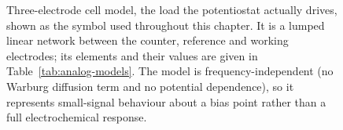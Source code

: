 \providecommand{\MaestroRoot}{include/analog/}

\begin{figure}[htbp]
  \centering
\begin{circuitikz}[
    every node/.append style={font=\footnotesize},
    nlab/.style={font=\scriptsize, inner sep=1.5pt},
  ]
\end{circuitikz}
  \caption[{Three-electrode cell model.}]{Three-electrode cell model, the load the potentiostat actually drives, shown as the symbol used throughout this chapter. It is a lumped linear network between the counter, reference and working electrodes; its elements and their values are given in Table~\ref{tab:analog-models}. The model is frequency-independent (no Warburg diffusion term and no potential dependence), so it represents small-signal behaviour about a bias point rather than a full electrochemical response.}
  \label{fig:randles-cell}
\end{figure}
